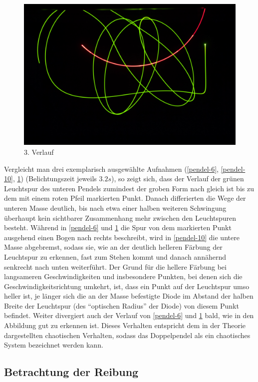 \begin{figure}
        \includegraphics[width=.9\textwidth]{images/pendel-9}
\caption{3. Verlauf}
\label{pendel-9}
\end{figure}



Vergleicht man drei exemplarisch ausgewählte Aufnahmen (\ref{pendel-6}, \ref{pendel-10}, \ref{pendel-9}) (Belichtungszeit jeweils $3.2s$), so zeigt sich, dass der Verlauf der grünen Leuchtspur des unteren Pendels zumindest der groben Form nach gleich ist bis zu dem mit einem roten Pfeil markierten Punkt. Danach differierten die Wege der unteren Masse deutlich, bis nach etwa einer halben weiteren Schwingung überhaupt kein sichtbarer Zusammenhang mehr zwischen den Leuchtspuren besteht. Während in \ref{pendel-6} und \ref{pendel-9} die Spur von dem markierten Punkt ausgehend einen Bogen nach rechts beschreibt, wird in \ref{pendel-10} die untere Masse abgebremst, sodass sie, wie an der deutlich helleren Färbung der Leuchtspur zu erkennen, fast zum Stehen kommt und danach annähernd senkrecht nach unten weiterführt. Der Grund für die hellere Färbung bei langsameren Geschwindigkeiten und insbesondere Punkten, bei denen sich die Geschwindigkeitsrichtung umkehrt, ist, dass ein Punkt auf der Leuchtspur umso heller ist, je länger sich die an der Masse befestigte Diode im Abstand der halben Breite der Leuchtspur (des \enquote{optischen Radius} der Diode) von diesem Punkt befindet. 
Weiter divergiert auch der Verlauf von \ref{pendel-6} und \ref{pendel-9} bald, wie in den Abbildung gut zu erkennen ist. 
Dieses Verhalten entspricht dem in der Theorie dargestellten chaotischen Verhalten, sodass das Doppelpendel als ein chaotisches System bezeichnet werden kann. 

\subsection{Betrachtung der Reibung}

